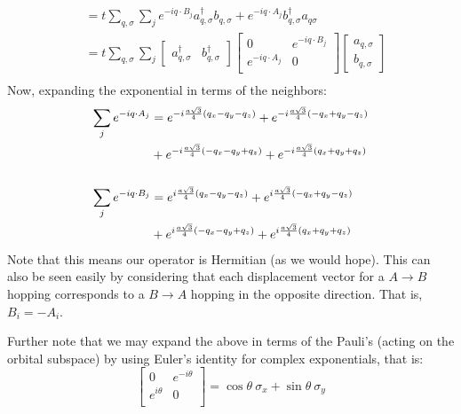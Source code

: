 \documentclass[10pt,a4paper]{article}
\begin{document}
\begin{multicols}{2}
\begin{align*}
&= t\sum_{q,\sigma}\sum_{j} e^{-iq\cdot B_j}a_{q,\sigma}^{\dagger}b_{q,\sigma} + e^{-iq\cdot A_j} b_{q,\sigma}^{\dagger} a_{q\sigma} \\ 
&=t\sum_{q,\sigma}\sum_{j}\begin{bmatrix} a_{q,\sigma}^{\dagger} & b_{q,\sigma}^{\dagger} \end{bmatrix}\begin{bmatrix} 0&e^{-iq\cdot B_j}\\e^{-iq\cdot A_j}&0\\ \end{bmatrix}\begin{bmatrix} a_{q,\sigma} \\ b_{q,\sigma}\end{bmatrix}\\
\end{align*}\normalsize
Now, expanding the exponential in terms of the neighbors:
\begin{align*}\small
\sum_{j}e^{-iq\cdot A_j}& = e^{-i\frac{a\sqrt{3}}{4}(q_x-q_y-q_z)}+e^{-i\frac{a\sqrt{3}}{4}(-q_x+q_y-q_z)}\\
&+e^{-i\frac{a\sqrt{3}}{4}(-q_x-q_y+q_z)}+e^{-i\frac{a\sqrt{3}}{4}(q_x+q_y+q_z)}\\
\\
\sum_{j}e^{-iq\cdot B_j}& = e^{i\frac{a\sqrt{3}}{4}(q_x-q_y-q_z)}+e^{i\frac{a\sqrt{3}}{4}(-q_x+q_y-q_z)}\\
&+e^{i\frac{a\sqrt{3}}{4}(-q_x-q_y+q_z)}+e^{i\frac{a\sqrt{3}}{4}(q_x+q_y+q_z)}\\
\end{align*}\normalsize
Note that this means our operator is Hermitian (as we would hope). This can also be seen easily by considering that each displacement vector for a $A\rightarrow B$ hopping corresponds to a $B\rightarrow A$ hopping in the opposite direction. That is, $B_i=-A_i$.

Further note that we may expand the above in terms of the Pauli's (acting on the orbital subspace) by using Euler's identity for complex exponentials, that is:
$$
\begin{bmatrix}
0& e^{-i\theta}\\
e^{i\theta}& 0 \\
\end{bmatrix}= \cos\theta\ \sigma_x + \sin\theta\ \sigma_y
$$


\end{multicols}
\end{document}
